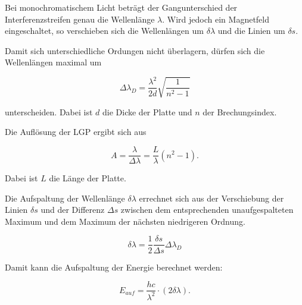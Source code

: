 Bei monochromatischem Licht beträgt der Gangunterschied der Interferenzstreifen genau die Wellenlänge $\lambda$. Wird
jedoch ein Magnetfeld eingeschaltet, so verschieben sich die Wellenlängen um $\delta \lambda$ und die Linien um
$\delta s$.

Damit sich unterschiedliche Ordungen nicht überlagern, dürfen sich die Wellenlängen maximal um

\begin{equation}
  \Delta\lambda_{D} = \frac{\lambda^2}{2d} \sqrt{\frac{1}{n^2-1}}
  \label{eqn:delta_lambda}
\end{equation}

unterscheiden. Dabei ist $d$ die Dicke der Platte und $n$ der Brechungsindex.

Die Auflösung der LGP ergibt sich aus

\begin{equation}
  A = \frac{\lambda}{\Delta\lambda} = \frac{L}{\lambda} \left(n^2-1\right) .
\end{equation}

Dabei ist $L$ die Länge der Platte.

Die Aufspaltung der Wellenlänge $\delta \lambda$ errechnet sich aus der Verschiebung der Linien $\delta s$ und der
Differenz $\Delta s$ zwischen dem entsprechenden unaufgespalteten Maximum und dem Maximum der nächsten niedrigeren Ordnung.

\begin{equation}
	\delta \lambda = \frac{1}{2} \frac{\delta s}{\Delta s} \Delta\lambda_{D}
	\label{eqn:del_lambda}
\end{equation}

Damit kann die Aufspaltung der Energie berechnet werden:

\begin{equation}
	E_{auf} = \frac{h c}{\lambda^2} \cdot (2 \delta \lambda) .
	\label{eqn:E_auf}
\end{equation}
